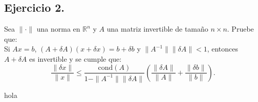 
\subsection*{Ejercicio 2.}
Sea $\| \cdot \|$ una norma en $\mathbb{R}^n$ y $A$ una matriz invertible de tamaño $n \times n$. Pruebe que:\\

Si $Ax = b$, $(A + \delta A)(x + \delta x) = b + \delta b$ y $\|A^{-1}\| \|\delta A\| < 1$, entonces $A + \delta A$ es invertible y se cumple que:
\[
\frac{\|\delta x\|}{\|x\|} \leq \frac{\text{cond}(A)}{1 - \|A^{-1}\| \|\delta A\|} \left( \frac{\|\delta A\|}{\|A\|} + \frac{\|\delta b\|}{\|b\|} \right).
\]

\begin{sproof}
    hola
\end{sproof}